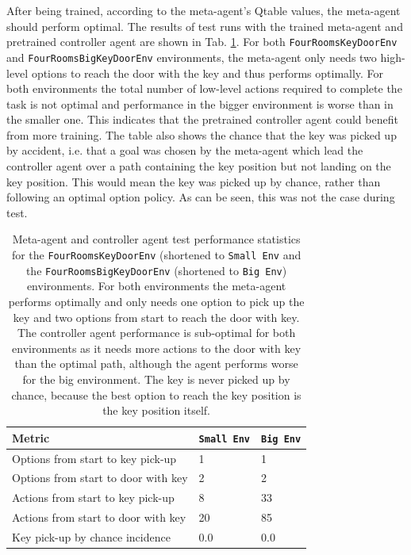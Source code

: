 \documentclass[conference]{IEEEtran}
\begin{document}
After being trained, according to the meta-agent's Qtable values, the meta-agent should perform optimal. The results of test runs with the trained meta-agent and pretrained controller agent are shown in Tab. \ref{tab:exp_option_her_test}. For both \texttt{FourRoomsKeyDoorEnv} and \texttt{FourRoomsBigKeyDoorEnv} environments, the meta-agent only needs two high-level options to reach the door with the key and thus performs optimally. For both environments the total number of low-level actions required to complete the task is not optimal and performance in the bigger environment is worse than in the smaller one. This indicates that the pretrained controller agent could benefit from more training. The table also shows the chance that the key was picked up by accident, i.e. that a goal was chosen by the meta-agent which lead the controller agent over a path containing the key position but not landing on the key position. This would mean the key was picked up by chance, rather than following an optimal option policy. As can be seen, this was not the case during test.

\begin{table}[ht]
\centering
\begin{tabular}{|l|l|l|}
  \hline
  Metric & \texttt{Small Env} & \texttt{Big Env} \\
  \hline
  Options from start to key pick-up   & 1 & 1 \\
  Options from start to door with key & 2 & 2 \\
  Actions from start to key pick-up   & 8 & 33 \\
  Actions from start to door with key & 20 & 85 \\
  Key pick-up by chance incidence     & 0.0 & 0.0 \\
  \hline
\end{tabular}
\caption{Meta-agent and controller agent test performance statistics for the \texttt{FourRoomsKeyDoorEnv} (shortened to \texttt{Small Env} and the \texttt{FourRoomsBigKeyDoorEnv} (shortened to \texttt{Big Env}) environments. For both environments the meta-agent performs optimally and only needs one option to pick up the key and two options from start to reach the door with key. The controller agent performance is sub-optimal for both environments as it needs more actions to the door with key than the optimal path, although the agent performs worse for the big environment. The key is never picked up by chance, because the best option to reach the key position is the key position itself.}
\label{tab:exp_option_her_test}
\end{table}
\end{document}
